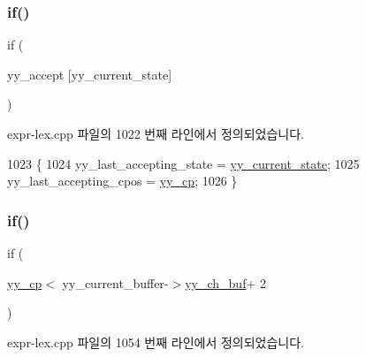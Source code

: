 \subsubsection{\texorpdfstring{if()}{if()}\hspace{0.1cm}{\footnotesize\ttfamily [2/9]}}
{\footnotesize\ttfamily if (\begin{DoxyParamCaption}\item[{yy\+\_\+accept}]{\mbox{[}yy\+\_\+current\+\_\+state\mbox{]} }\end{DoxyParamCaption})}



expr-\/lex.\+cpp 파일의 1022 번째 라인에서 정의되었습니다.


\begin{DoxyCode}
1023                 \{
1024                 yy\_last\_accepting\_state = \mbox{\hyperlink{expr-lex_8cpp_abb8b9672f94e21056888ae611b41cd1b}{yy\_current\_state}};
1025                 yy\_last\_accepting\_cpos = \mbox{\hyperlink{expr-lex_8cpp_aebf8322d98e81db5af081bb22a5f06fe}{yy\_cp}};
1026                 \}
\end{DoxyCode}
\mbox{\label{expr-lex_8cpp_af866e536ece63dc9a073311488ba32d5}} 
\subsubsection{\texorpdfstring{if()}{if()}\hspace{0.1cm}{\footnotesize\ttfamily [3/9]}}
{\footnotesize\ttfamily if (\begin{DoxyParamCaption}\item[{\mbox{\hyperlink{expr-lex_8cpp_aebf8322d98e81db5af081bb22a5f06fe}{yy\+\_\+cp}}$<$ yy\+\_\+current\+\_\+buffer-\/$>$\mbox{\hyperlink{expr-lex_8cpp_a49f3339224f2ff52f9191b351b184dbd}{yy\+\_\+ch\+\_\+buf}}+}]{2 }\end{DoxyParamCaption})}



expr-\/lex.\+cpp 파일의 1054 번째 라인에서 정의되었습니다.


